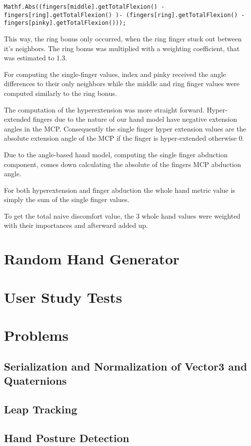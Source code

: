 \texttt{Mathf.Abs((fingers[middle].getTotalFlexion() - fingers[ring].getTotalFlexion() )- (fingers[ring].getTotalFlexion() - fingers[pinky].getTotalFlexion()));}

This way, the ring bonus only occurred, when the ring finger stuck out between it's neighbors. The ring bonus was multiplied with a weighting coefficient, that was estimated to 1.3.

For computing the single-finger values, index and pinky received the angle differences to their only neighbors while the middle and ring finger values were computed similarly to the ring bonus. 

The computation of the hyperextension was more straight forward. Hyper-extended fingers due to the nature of our hand model have negative extension angles in the MCP. Consequently the single finger hyper extension values are the absolute extension angle of the MCP if the finger is hyper-extended otherwise 0. 

Due to the angle-based hand model, computing the single finger abduction component, comes down calculating the absolute of the fingers MCP abduction angle.

For both hyperextension and finger abduction the whole hand metric value is simply the sum of the single finger values. 

To get the total naive discomfort value, the 3 whole hand values were weighted with their importances and afterward added up.

\section{Random Hand Generator}

\section{User Study Tests}

\section{Problems}

\subsection{Serialization and Normalization of Vector3 and Quaternions}

\subsection{Leap Tracking}

\subsection{Hand Posture Detection}

